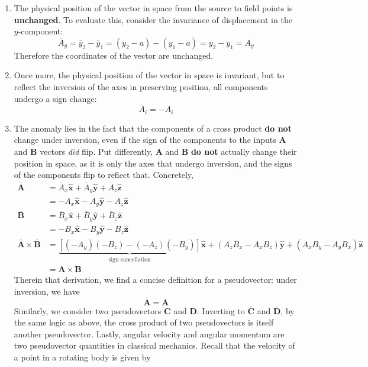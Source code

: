 \documentclass[a4paper]{article}
\begin{document}
\begin{enumerate}[label=(\alph*)]
	\item The physical position of the vector in space from the source to field points is \textbf{unchanged}. To evaluate this, consider the invariance of displacement in the \( y \)-component:
	\[
		 \overline{A}_{y} = \overline{y}_{2} - \overline{y}_{1} = \!\left( y_{2} - a \right) - \!\left( y_{1} - a \right) = y_{2} - y_{1} = A_{y}
	\]
	Therefore the coordinates of the vector are unchanged.
	\item Once more, the physical position of the vector in space is invariant, but to reflect the inversion of the axes in preserving position, all components undergo a sign change:
	\[
		\overline{A}_{i} = -A_{i} 
	\]
	\item The anomaly lies in the fact that the components of a cross product \textbf{do not} change under inversion, even if the sign of the components to the inputs \( \pmb{A} \) and \( \pmb{B} \) vectors \textit{did} flip. Put differently, \( \pmb{A} \) and \( \pmb{B} \) \textbf{do not} actually change their position in space, as it is only the axes that undergo inversion, and the signs of the components flip to reflect that. Concretely,
	\begin{align*}
		\overline{\pmb{A}} & = \overline{A}_{x}\pmb{\hat{x}} + \overline{A}_{y}\pmb{\hat{y}} + \overline{A}_{z}\pmb{\hat{z}} \\
				   & = -A_{x}\pmb{\hat{x}} - A_{y}\pmb{\hat{y}} - A_{z}\pmb{\hat{z}} \\
		\overline{\pmb{B}} & = \overline{B}_{x}\pmb{\hat{x}} + \overline{B}_{y}\pmb{\hat{y}} + \overline{B}_{z}\pmb{\hat{z}} \\
		                   & = -B_{x}\pmb{\hat{x}} - B_{y}\pmb{\hat{y}} - B_{z}\pmb{\hat{z}} \\
		\overline{\pmb{A}} \times \overline{\pmb{B}} & = \underbrace{\!\left[ \!\left( -A_{y} \right)\!\left( -B_{z} \right) - \!\left( -A_{z} \right)\!\left( -B_{y}\right) \right]}_{\text{sign cancellation}}\pmb{\hat{x}} + \!\left( A_{z}B_{x} - A_{x}B_{z} \right)\pmb{\hat{y}} + \!\left( A_{x}B_{y} - A_{y}B_{x} \right)\pmb{\hat{z}} \\
							     & = \pmb{A} \times \pmb{B}
	\end{align*}
	Therein that derivation, we find a concise definition for a pseudovector: under inversion, we have
	\[
		\overline{\pmb{A}} = \pmb{A} 
	\]
	Similarly, we consider two pseudovectors \( \pmb{C} \) and \( \pmb{D} \). Inverting to \( \pmb{\overline{C}} \) and \( \pmb{\overline{D}} \), by the same logic as above, the cross product of two pseudovectors is itself another pseudovector. Lastly, angular velocity and angular momentum are two pseudovector quantities in classical mechanics. Recall that the velocity of a point in a rotating body is given by

\end{enumerate}
\end{document}
